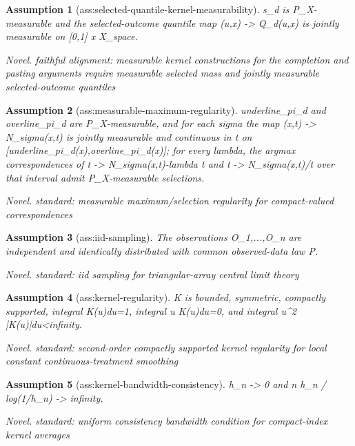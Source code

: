 \documentclass{article}
\newtheorem{assumption}{Assumption}
\begin{document}
\begin{assumption}[ass:selected-quantile-kernel-measurability]\label{ass:selected-quantile-kernel-measurability}
s_d is P_X-measurable and the selected-outcome quantile map (u,x) -> Q_d(u,x) is jointly measurable on [0,1] x X_space.
\par\smallskip\noindent\emph{Novel.} faithful alignment: measurable kernel constructions for the completion and pasting arguments require measurable selected mass and jointly measurable selected-outcome quantiles
\end{assumption}

\begin{assumption}[ass:measurable-maximum-regularity]\label{ass:measurable-maximum-regularity}
underline_pi_d and overline_pi_d are P_X-measurable, and for each sigma the map (x,t) -> N_sigma(x,t) is jointly measurable and continuous in t on [underline_pi_d(x),overline_pi_d(x)]; for every lambda, the argmax correspondences of t -> N_sigma(x,t)-lambda t and t -> N_sigma(x,t)/t over that interval admit P_X-measurable selections.
\par\smallskip\noindent\emph{Novel.} standard: measurable maximum/selection regularity for compact-valued correspondences
\end{assumption}

\begin{assumption}[ass:iid-sampling]\label{ass:iid-sampling}
The observations O_1,...,O_n are independent and identically distributed with common observed-data law P.
\par\smallskip\noindent\emph{Novel.} standard: iid sampling for triangular-array central limit theory
\end{assumption}

\begin{assumption}[ass:kernel-regularity]\label{ass:kernel-regularity}
K is bounded, symmetric, compactly supported, integral K(u)du=1, integral u K(u)du=0, and integral u^2 |K(u)|du<infinity.
\par\smallskip\noindent\emph{Novel.} standard: second-order compactly supported kernel regularity for local constant continuous-treatment smoothing
\end{assumption}

\begin{assumption}[ass:kernel-bandwidth-consistency]\label{ass:kernel-bandwidth-consistency}
h_n -> 0 and n h_n / log(1/h_n) -> infinity.
\par\smallskip\noindent\emph{Novel.} standard: uniform consistency bandwidth condition for compact-index kernel averages
\end{assumption}
\end{document}
